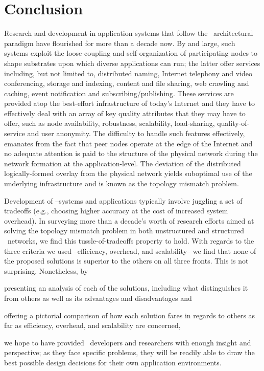 \section{Conclusion}
\label{section:conclusion}

Research and development in application systems that follow the 
\p\ architectural paradigm have flourished for more than a decade now.
By and large, such systems exploit the loose-coupling and self-organization 
of participating nodes to shape substrates upon which diverse applications 
can run; the latter offer services including, but not limited to, 
distributed naming, 
Internet telephony and video conferencing, 
storage and indexing, 
content and file sharing, 
web crawling and caching, 
event notification and subscribing/publishing.
These services are provided atop the 
best-effort infrastructure of today's Internet 
and they have to effectively deal with an array of key quality attributes that
they may have to offer, such as node availability, robustness,
scalability, load-sharing, quality-of-service and user anonymity.
The difficulty to handle such features effectively, emanates from the fact that
peer nodes operate at the edge of the Internet and no adequate attention 
is paid to the structure of the physical network during the 
network formation at the application-level.
The deviation of the distributed logically-formed overlay from the 
physical network yields suboptimal use of the underlying 
infrastructure and is known as the topology mismatch
problem.

Development of \p--systems and applications
typically involve juggling a set of tradeoffs (e.g.,
choosing higher accuracy at the cost of increased system overhead).
In surveying more than
a decade's worth of research efforts aimed at solving the topology mismatch
problem in both unstructured and structured \p\ networks, we find this
tussle-of-tradeoffs property to hold.  
With regards to the three criteria we used --efficiency,
overhead, and scalability-- we find that none of the proposed solutions 
is superior to the others on all three fronts.  This is not surprising.
Nonetheless, by
\begin{inparaenum}
  \item presenting an analysis of each of the solutions,
including what distinguishes it from 
others as well as its advantages and disadvantages and 
  \item offering a pictorial
comparison of how each solution fares in regards to others as far as
efficiency, overhead, and scalability are concerned,
\end{inparaenum}
we hope to have provided \p\
developers and researchers with enough insight and perspective;
as they face specific problems, they will be readily able to 
draw the best possible design decisions for their own application
environments.
